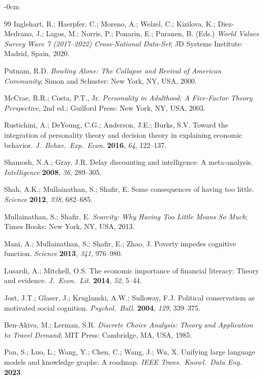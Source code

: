\documentclass[sustainability,article,submit,pdftex,moreauthors]{Definitions/mdpi}
\begin{document}
\begin{adjustwidth}{-\extralength}{0cm}
\begin{thebibliography}{99}
Inglehart, R.; Haerpfer, C.; Moreno, A.; Welzel, C.; Kizilova, K.;
Diez-Medrano, J.; Lagos, M.; Norris, P.; Ponarin, E.; Puranen, B. (Eds.)
\textit{World Values Survey Wave 7 (2017--2022) Cross-National Data-Set};
JD Systems Institute: Madrid, Spain, 2020.

Putnam, R.D.
\textit{Bowling Alone: The Collapse and Revival of American Community};
Simon and Schuster: New York, NY, USA, 2000.

McCrae, R.R.; Costa, P.T., Jr.
\textit{Personality in Adulthood: A Five-Factor Theory Perspective}, 2nd ed.;
Guilford Press: New York, NY, USA, 2003.

Rustichini, A.; DeYoung, C.G.; Anderson, J.E.; Burks, S.V.
Toward the integration of personality theory and decision theory in explaining
economic behavior. \textit{J.\ Behav.\ Exp.\ Econ.} \textbf{2016},
\textit{64}, 122--137.

Shamosh, N.A.; Gray, J.R. Delay discounting and intelligence: A meta-analysis.
\textit{Intelligence} \textbf{2008}, \textit{36}, 289--305.

Shah, A.K.; Mullainathan, S.; Shafir, E. Some consequences of having too little.
\textit{Science} \textbf{2012}, \textit{338}, 682--685.

Mullainathan, S.; Shafir, E.
\textit{Scarcity: Why Having Too Little Means So Much};
Times Books: New York, NY, USA, 2013.

Mani, A.; Mullainathan, S.; Shafir, E.; Zhao, J. Poverty impedes cognitive
function. \textit{Science} \textbf{2013}, \textit{341}, 976--980.

Lusardi, A.; Mitchell, O.S. The economic importance of financial literacy:
Theory and evidence.
\textit{J.\ Econ.\ Lit.} \textbf{2014}, \textit{52}, 5--44.

Jost, J.T.; Glaser, J.; Kruglanski, A.W.; Sulloway, F.J. Political conservatism
as motivated social cognition.
\textit{Psychol.\ Bull.} \textbf{2004}, \textit{129}, 339--375.

Ben-Akiva, M.; Lerman, S.R.
\textit{Discrete Choice Analysis: Theory and Application to Travel Demand};
MIT Press: Cambridge, MA, USA, 1985.

Pan, S.; Luo, L.; Wang, Y.; Chen, C.; Wang, J.; Wu, X. Unifying large language
models and knowledge graphs: A roadmap.
\textit{IEEE Trans.\ Knowl.\ Data Eng.} \textbf{2023}.


\end{thebibliography}
\end{adjustwidth}
\end{document}
